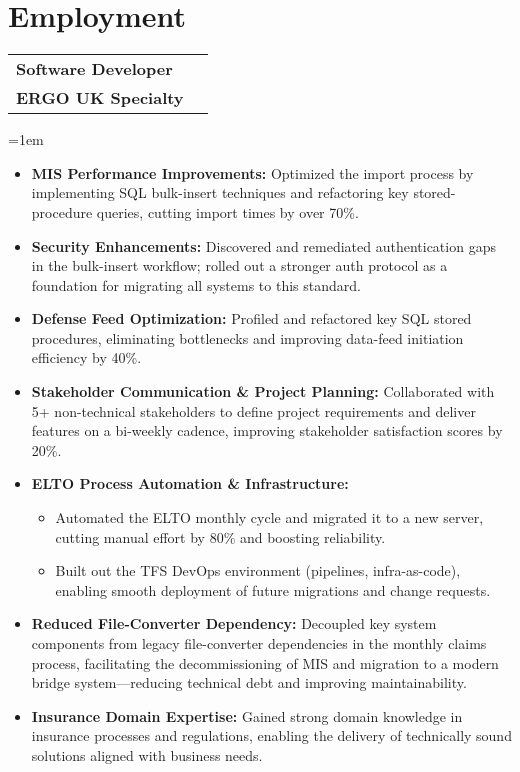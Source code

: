 \documentclass[paper=a4,fontsize=11pt]{article}
\makeatletter
\newcommand{\NewPart}[1]{\section{#1}}
\newcommand{\WorkEntry}[4]{
	\noindent
	\begin{tabularx}{\textwidth}{@{}X r@{}}
		\textbf{\large\color{primary}#1} & \textbf{\color{secondary}#2} \\
		\textbf{\color{secondary}#3} & \\
	\end{tabularx}
	\vspace{4pt}
	\noindent\hangindent=1em\hangafter=0 #4
	\vspace{8pt}
}
\makeatother
\begin{document}
\NewPart{Employment}{}
\WorkEntry{Software Developer}{\textbf{\hspace{-2cm}{August2024–Present}}}{ERGO UK Specialty}{
    \begin{itemize}
        \itemsep-0.1em 
        \item \textbf{MIS Performance Improvements:} Optimized the import process by implementing SQL bulk-insert techniques and refactoring key stored-procedure queries, cutting import times by over 70\%.
        \item \textbf{Security Enhancements:} Discovered and remediated authentication gaps in the bulk-insert workflow; rolled out a stronger auth protocol as a foundation for migrating all systems to this standard.
        \item \textbf{Defense Feed Optimization:} Profiled and refactored key SQL stored procedures, eliminating bottlenecks and improving data-feed initiation efficiency by 40\%.
  \item \textbf{Stakeholder Communication \& Project Planning:} Collaborated with 5+ non-technical stakeholders to define project requirements and deliver features on a bi-weekly cadence, improving stakeholder satisfaction scores by 20\%.
        \item \textbf{ELTO Process Automation \& Infrastructure:}
            \begin{itemize}
                \item Automated the ELTO monthly cycle and migrated it to a new server, cutting manual effort by 80\% and boosting reliability.
                \item Built out the TFS DevOps environment (pipelines, infra-as-code), enabling smooth deployment of future migrations and change requests.
            \end{itemize}
		\item \textbf{Reduced File-Converter Dependency:} Decoupled key system components from legacy file-converter dependencies in the monthly claims process, facilitating the decommissioning of MIS and migration to a modern bridge system—reducing technical debt and improving maintainability.

       \item \textbf{Insurance Domain Expertise:} Gained strong domain knowledge in insurance processes and regulations, enabling the delivery of technically sound solutions aligned with business needs.
    \end{itemize}
}
\end{document}
